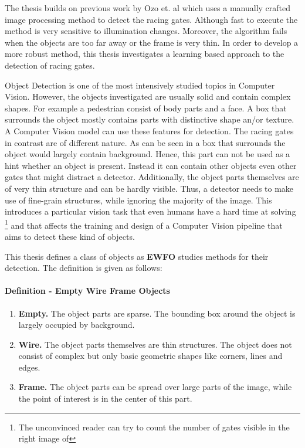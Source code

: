The thesis builds on previous work by Ozo et. al  which uses a manually crafted image processing method to detect the racing gates. Although fast to execute the method is very sensitive to illumination changes. Moreover, the algorithm fails when the objects are too far away or the frame is very thin. In order to develop a more robust method, this thesis investigates a learning based approach to the detection of racing gates.

Object Detection is one of the most intensively studied topics in Computer Vision. However, the objects investigated are usually solid and contain complex shapes. For example a pedestrian consist of body parts and a face. A box that surrounds the object mostly contains parts with distinctive shape an/or texture. A Computer Vision model can use these features for detection. The racing gates in contrast are of different nature. As can be seen in  a box that surrounds the object would largely contain background. Hence, this part can not be used as a hint whether an object is present. Instead it can contain other objects even other gates that might distract a detector. Additionally, the object parts themselves are of very thin structure and can be hardly visible. Thus, a detector needs to make use of fine-grain structures, while ignoring the majority of the image. This introduces a particular vision task that even humans have a hard time at solving \footnote{The unconvinced reader can try to count the number of gates visible in the right image of } and that affects the training and design of a Computer Vision pipeline that aims to detect these kind of objects.

This thesis defines a class of objects as \textbf{\ac{EWFO}} studies methods for their detection. The definition is given as follows:

\paragraph{Definition - Empty Wire Frame Objects}	
\begin{enumerate}
	\item \textbf{Empty.} The object parts are sparse. The bounding box around the object is largely occupied by background.
	\item \textbf{Wire.} The object parts themselves are thin structures. The object does not consist of complex but only basic geometric shapes like corners, lines and edges.
	\item \textbf{Frame.} The object parts can be spread over large parts of the image, while the point of interest is in the center of this part.

\end{enumerate}

